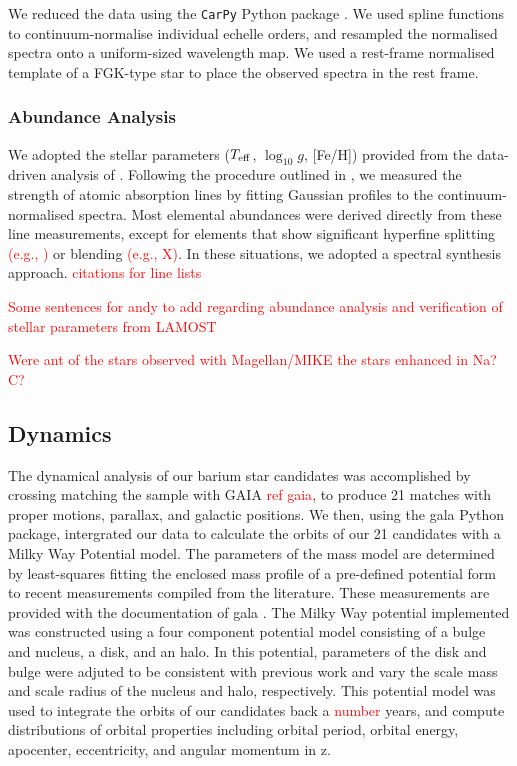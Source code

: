 \documentclass[a4paper,fleqn,usenatbib]{mnras}
\newcommand{\todo}[1]{\textcolor{red}{#1}}
\begin{document}
We reduced the data using the \texttt{CarPy} Python package \citep{kels03,kels14}. We used spline functions to continuum-normalise individual echelle orders, and resampled the normalised spectra onto a uniform-sized wavelength map. We used a rest-frame normalised template of a FGK-type star to place the observed spectra in the rest frame.


\subsubsection{Abundance Analysis}
We adopted the stellar parameters ($T_{\rm eff}$, $\log_{10}g$, [Fe/H]) provided from the data-driven analysis of \citep{Ho_2017}. Following the procedure outlined in \citep{Casey_2014}, we measured the strength of atomic absorption lines by fitting Gaussian profiles to the continuum-normalised spectra. Most elemental abundances were derived directly from these line measurements, except for elements that show significant hyperfine splitting \todo{(e.g., )} or blending \todo{(e.g., X)}. In these situations, we adopted a spectral synthesis approach. \todo{citations for line lists}


\todo{Some sentences for andy to add regarding abundance analysis and verification of stellar parameters from LAMOST}

\todo{Were ant of the stars observed with Magellan/MIKE the stars enhanced in Na? C?}



\subsection{Dynamics}
The dynamical analysis of our barium star candidates was accomplished by crossing matching the sample with GAIA \todo{ref gaia}, to produce 21 matches with proper motions, parallax, and galactic positions. We then, using the gala Python package, intergrated our data to calculate the orbits of our 21 candidates with a Milky Way Potential model. The parameters of the mass model are determined by least-squares fitting the enclosed mass profile of a pre-defined potential form to recent measurements compiled from the literature. These measurements are provided with the documentation of gala \citep{price2017}. The Milky Way potential implemented was constructed using a four component potential model consisting of a \citet{hernquist1990} bulge and nucleus, a \citet{miyamoto1975} disk, and an \citet{nfw1997} halo. In this potential, parameters of the disk and bulge were adjuted to be consistent with previous work \citep{bovy2015} and vary the scale mass and scale radius of the nucleus and halo, respectively. This potential model was used to integrate the orbits of our candidates back a \todo{number} years, and compute distributions of orbital properties including orbital period, orbital energy, apocenter, eccentricity, and angular momentum in z.
\end{document}
